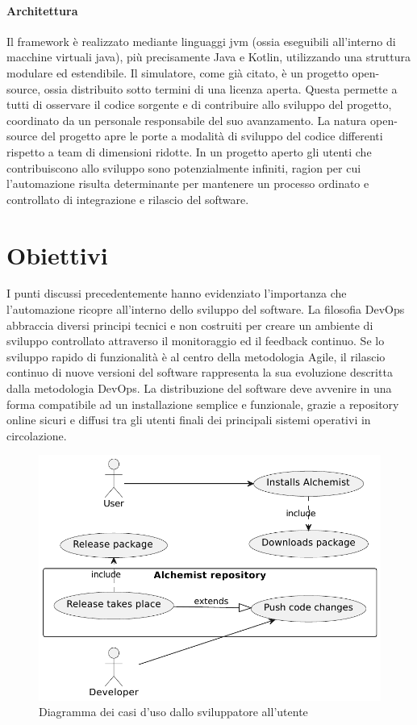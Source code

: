 \paragraph{Architettura}
Il framework è realizzato mediante linguaggi \ac{jvm} (ossia eseguibili all'interno di macchine virtuali java), più precisamente Java e Kotlin, utilizzando una struttura modulare ed estendibile. Il simulatore, come già citato, è un progetto open-source, ossia distribuito sotto termini di una licenza aperta. Questa permette a tutti di osservare il codice sorgente e di contribuire allo sviluppo del progetto, coordinato da un personale responsabile del suo avanzamento. La natura open-source del progetto apre le porte a modalità di sviluppo del codice differenti rispetto a team di dimensioni ridotte. In un progetto aperto gli utenti che contribuiscono allo sviluppo sono potenzialmente infiniti, ragion per cui l'automazione risulta determinante per mantenere un processo ordinato e controllato di integrazione e rilascio del software.

\section{Obiettivi}
I punti discussi precedentemente hanno evidenziato l'importanza che l'automazione ricopre all'interno dello sviluppo del software. La filosofia DevOps abbraccia diversi principi tecnici e non costruiti per creare un ambiente di sviluppo controllato attraverso il monitoraggio ed il feedback continuo. Se lo sviluppo rapido di funzionalità è al centro della metodologia Agile, il rilascio continuo di nuove versioni del software rappresenta la sua evoluzione descritta dalla metodologia DevOps. La distribuzione del software deve avvenire in una forma compatibile ad un installazione semplice e funzionale, grazie a repository online sicuri e diffusi tra gli utenti finali dei principali sistemi operativi in circolazione.

\begin{figure}[htb]
	\centering
	\includegraphics[width=.75\linewidth]{figures/use-case-diagram.pdf}
	\caption{Diagramma dei casi d'uso dallo sviluppatore all'utente}
	\label{fig:use-case-diagram}
\end{figure}

